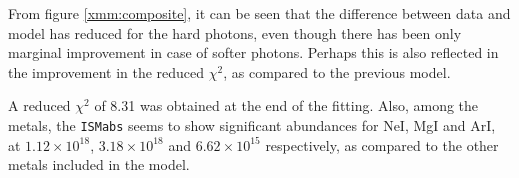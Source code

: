 				From figure \ref{xmm:composite}, it can be seen that the difference between data and model has reduced for the hard photons, even though there has been only marginal improvement in case of softer photons. Perhaps this is also reflected in the improvement in the reduced $\chi^2$, as compared to the previous model.
				
				A reduced $\chi^2$ of 8.31 was obtained at the end of the fitting. Also, among the metals, the \texttt{ISMabs} seems to show significant abundances for NeI, MgI and ArI, at $1.12\times 10^{18}$, $3.18\times 10^{18}$ and $6.62\times 10^{15}$ respectively, as compared to the other metals included in the model.
